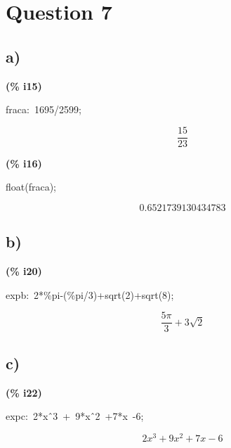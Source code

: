 \documentclass[fleqn]{article}
\begin{document}
\section{Question 7}

\subsection{a)}


\noindent
\begin{minipage}[t]{4.000000em}\color{red}\bfseries
(\% i15)	
\end{minipage}
\begin{minipage}[t]{\textwidth}\color{blue}
fraca:\ 1695/2599;
\end{minipage}
\[\displaystyle \tag{calc} 
\frac{15}{23}\mbox{}
\]


\noindent
\begin{minipage}[t]{4.000000em}\color{red}\bfseries
(\% i16)	
\end{minipage}
\begin{minipage}[t]{\textwidth}\color{blue}
float(fraca);
\end{minipage}
\[\displaystyle \tag{\% o16} 
0.6521739130434783\mbox{}
\]

\subsection{b)}


\noindent
\begin{minipage}[t]{4.000000em}\color{red}\bfseries
(\% i20)	
\end{minipage}
\begin{minipage}[t]{\textwidth}\color{blue}
expb:\ 2*\%pi-(\%pi/3)+sqrt(2)+sqrt(8);
\end{minipage}
\[\displaystyle \tag{expb} 
\frac{5 \ensuremath{\pi} }{3}\mathop{+}3 \sqrt{2}\mbox{}
\]

\subsection{c)}


\noindent
\begin{minipage}[t]{4.000000em}\color{red}\bfseries
(\% i22)	
\end{minipage}
\begin{minipage}[t]{\textwidth}\color{blue}
expc:\ 2*x\^\ 3\ +\ 9*x\^\ 2\ +7*x\ -6;
\end{minipage}
\[\displaystyle \tag{expc} 
2 {{x}^{3}}\mathop{+}9 {{x}^{2}}\mathop{+}7 x\mathop{-}6\mbox{}
\]
\end{document}
